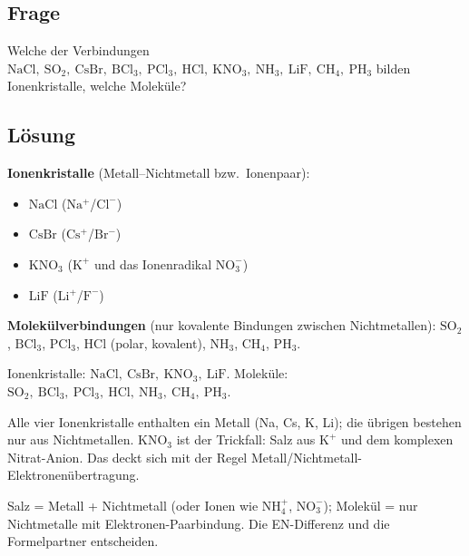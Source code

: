 
\subsection*{Frage}
Welche der Verbindungen $\mathrm{NaCl,\ SO_2,\ CsBr,\ BCl_3,\ PCl_3,\ HCl,\ KNO_3,\
NH_3,\ LiF,\ CH_4,\ PH_3}$ bilden Ionenkristalle, welche Moleküle?

\subsection*{Lösung}
\textbf{Ionenkristalle} (Metall--Nichtmetall bzw.\ Ionenpaar):
\begin{itemize}
  \item $\mathrm{NaCl}$ ($\mathrm{Na^+}$/$\mathrm{Cl^-}$)
  \item $\mathrm{CsBr}$ ($\mathrm{Cs^+}$/$\mathrm{Br^-}$)
  \item $\mathrm{KNO_3}$ ($\mathrm{K^+}$ und das Ionenradikal $\mathrm{NO_3^-}$)
  \item $\mathrm{LiF}$ ($\mathrm{Li^+}$/$\mathrm{F^-}$)
\end{itemize}
\textbf{Molekülverbindungen} (nur kovalente Bindungen zwischen Nichtmetallen):
$\mathrm{SO_2}$, $\mathrm{BCl_3}$, $\mathrm{PCl_3}$, $\mathrm{HCl}$ (polar,
kovalent), $\mathrm{NH_3}$, $\mathrm{CH_4}$, $\mathrm{PH_3}$.

\begin{ergebnis}
Ionenkristalle: $\mathrm{NaCl,\ CsBr,\ KNO_3,\ LiF}$. Moleküle:
$\mathrm{SO_2,\ BCl_3,\ PCl_3,\ HCl,\ NH_3,\ CH_4,\ PH_3}$.
\end{ergebnis}

\begin{kontrolle}
Alle vier Ionenkristalle enthalten ein Metall (Na, Cs, K, Li); die übrigen
bestehen nur aus Nichtmetallen. $\mathrm{KNO_3}$ ist der Trickfall: Salz aus $\mathrm{K^+}$ und dem komplexen
Nitrat-Anion. Das deckt sich mit der Regel Metall/Nichtmetall-Elektronenübertragung.
\end{kontrolle}

\begin{merksatz}
Salz = Metall + Nichtmetall (oder Ionen wie $\mathrm{NH_4^+}$, $\mathrm{NO_3^-}$);
Molekül = nur Nichtmetalle mit Elektronen-Paarbindung. Die EN-Differenz und die
Formelpartner entscheiden.
\end{merksatz}
